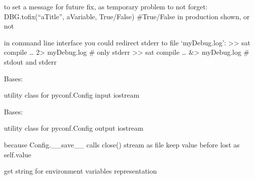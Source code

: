 \documentclass[a4paper,10pt,english]{sphinxmanual}
\begin{document}
to set a message for future fix, as temporary problem to not forget:
DBG.tofix(“aTitle”, aVariable, True/False) \#True/False in production shown, or not

in command line interface you could redirect stderr to file ‘myDebug.log’:
\textgreater{}\textgreater{} sat compile … 2\textgreater{} myDebug.log   \# only stderr
\textgreater{}\textgreater{} sat compile … \&\textgreater{} myDebug.log   \# stdout and stderr

\begin{fulllineitems}
\label{\detokenize{commands/apidoc/src:src.debug.InStream}}
Bases: 

utility class for pyconf.Config input iostream

\end{fulllineitems}


\begin{fulllineitems}
\label{\detokenize{commands/apidoc/src:src.debug.OutStream}}
Bases: 

utility class for pyconf.Config output iostream

\begin{fulllineitems}
\label{\detokenize{commands/apidoc/src:src.debug.OutStream.close}}
because Config.\_\_save\_\_ calls close() stream as file
keep value before lost as self.value

\end{fulllineitems}


\end{fulllineitems}


\begin{fulllineitems}
\label{\detokenize{commands/apidoc/src:src.debug.getLocalEnv}}
get string for environment variables representation

\end{fulllineitems}
\end{document}
